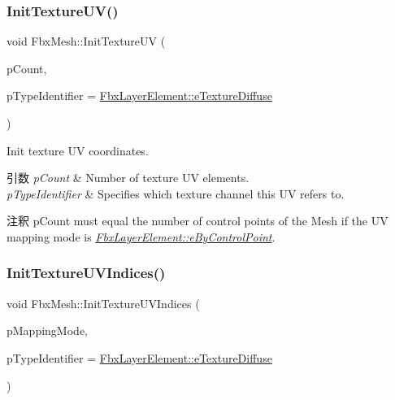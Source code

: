 \mbox{\label{class_fbx_mesh_a40d57aa570c080f2f692728118b5bc04}} 
\subsubsection{\texorpdfstring{Init\+Texture\+U\+V()}{InitTextureUV()}}
{\footnotesize\ttfamily void Fbx\+Mesh\+::\+Init\+Texture\+UV (\begin{DoxyParamCaption}\item[{int}]{p\+Count,  }\item[{\hyperlink{class_fbx_layer_element_a8c95c5cd880b56c776acd379bd86f42c}{Fbx\+Layer\+Element\+::\+E\+Type}}]{p\+Type\+Identifier = {\ttfamily \hyperlink{class_fbx_layer_element_a8c95c5cd880b56c776acd379bd86f42ca09829e6ecf512e7ae04d9ad8de1342fa}{Fbx\+Layer\+Element\+::e\+Texture\+Diffuse}} }\end{DoxyParamCaption})}

Init texture UV coordinates. 
\begin{DoxyParams}{引数}
{\em p\+Count} & Number of texture UV elements. \\
\hline
{\em p\+Type\+Identifier} & Specifies which texture channel this UV refers to. \\
\hline
\end{DoxyParams}
\begin{DoxyRemark}{注釈}
{\ttfamily p\+Count} must equal the number of control points of the Mesh if the UV mapping mode is {\itshape \hyperlink{class_fbx_layer_element_a5a40e95db30ae9f94611dc3f1568af26ad64b7f5885f295d3eacb5fed40bb0cad}{Fbx\+Layer\+Element\+::e\+By\+Control\+Point}}. 
\end{DoxyRemark}
\mbox{\label{class_fbx_mesh_a1b6a5d5371f59f8cda80f8cbcfefadf7}} 
\subsubsection{\texorpdfstring{Init\+Texture\+U\+V\+Indices()}{InitTextureUVIndices()}}
{\footnotesize\ttfamily void Fbx\+Mesh\+::\+Init\+Texture\+U\+V\+Indices (\begin{DoxyParamCaption}\item[{\hyperlink{class_fbx_layer_element_a5a40e95db30ae9f94611dc3f1568af26}{Fbx\+Layer\+Element\+::\+E\+Mapping\+Mode}}]{p\+Mapping\+Mode,  }\item[{\hyperlink{class_fbx_layer_element_a8c95c5cd880b56c776acd379bd86f42c}{Fbx\+Layer\+Element\+::\+E\+Type}}]{p\+Type\+Identifier = {\ttfamily \hyperlink{class_fbx_layer_element_a8c95c5cd880b56c776acd379bd86f42ca09829e6ecf512e7ae04d9ad8de1342fa}{Fbx\+Layer\+Element\+::e\+Texture\+Diffuse}} }\end{DoxyParamCaption})}

